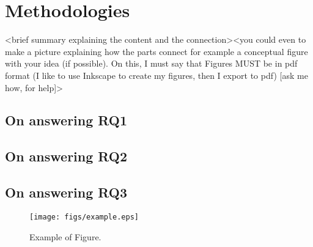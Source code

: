 \section{Methodologies}
<brief summary explaining the content and the connection><you could even to make a picture explaining how the parts connect for example a conceptual figure with your idea (if possible). On this, I must say that Figures MUST be in pdf format (I like to use Inkscape to create my figures, then I export to pdf) [ask me how, for help]> 

\subsection{On answering RQ1}

\subsection{On answering RQ2}

\subsection{On answering RQ3}
\begin{figure}[h!]
	\label{fig:approach}
	\centering
	\texttt{[image: figs/example.eps]}
	\caption{Example of Figure.}
\end{figure}
